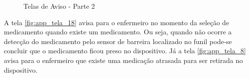 \begin{apendicesenv}
\begin{figure}[H]
    \centering
    \caption{Telas de Aviso - Parte 2}\label{fig:telas_17_19_20}
\end{figure}

A tela \ref{fig:app_tela_18} avisa para o enfermeiro no momento da seleção de medicamento quando existe um medicamento. Ou seja, quando não ocorre a detecção do medicamento pelo sensor de barreira localizado no funil pode-se concluir que o medicamento ficou preso no dispositivo. Já a tela \ref{fig:app_tela_8} avisa para o enfermeiro que existe uma medicação atrasada para ser retirada no dispositivo.


\end{apendicesenv}
